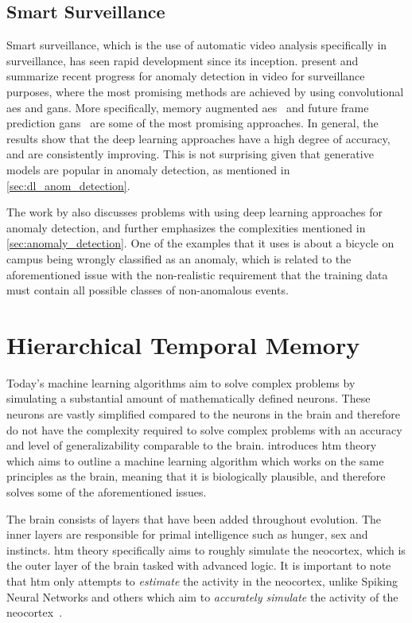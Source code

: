 \subsection{Smart Surveillance}
Smart surveillance, which is the use of automatic video analysis specifically in surveillance, has seen rapid development since its inception. \textcite{anomalyvideo, smart_surveillance_2} present and summarize recent progress for anomaly detection in video for surveillance purposes, where the most promising methods are achieved by using convolutional \glspl*{ae} and \glspl*{gan}. More specifically, memory augmented \glspl*{ae}~\cite{memae} and future frame prediction \glspl*{gan}~\cite{future_frame_prediction} are some of the most promising approaches. In general, the results show that the deep learning approaches have a high degree of accuracy, and are consistently improving. This is not surprising given that generative models are popular in anomaly detection, as mentioned in \autoref{sec:dl_anom_detection}.
\par
The work by \textcite{anomalyvideo} also discusses problems with using deep learning approaches for anomaly detection, and further emphasizes the complexities mentioned in \autoref{sec:anomaly_detection}. One of the examples that it uses is about a bicycle on campus being wrongly classified as an anomaly, which is related to the aforementioned issue with the non-realistic requirement that the training data must contain all possible classes of non-anomalous events.

\section{Hierarchical Temporal Memory}
Today's machine learning algorithms aim to solve complex problems by simulating a substantial amount of mathematically defined neurons. These neurons are vastly simplified compared to the neurons in the brain and therefore do not have the complexity required to solve complex problems with an accuracy and level of generalizability comparable to the brain. \textcite{BAMI} introduces \gls*{htm} theory which aims to outline a machine learning algorithm which works on the same principles as the brain, meaning that it is biologically plausible, and therefore solves some of the aforementioned issues.\par
The brain consists of layers that have been added throughout evolution. The inner layers are responsible for primal intelligence such as hunger, sex and instincts. \gls*{htm} theory specifically aims to roughly simulate the neocortex, which is the outer layer of the brain tasked with advanced logic. It is important to note that \gls*{htm} only attempts to \emph{estimate} the activity in the neocortex, unlike Spiking Neural Networks and others which aim to \emph{accurately simulate} the activity of the neocortex~\cite{spiking_neural_networks}.
